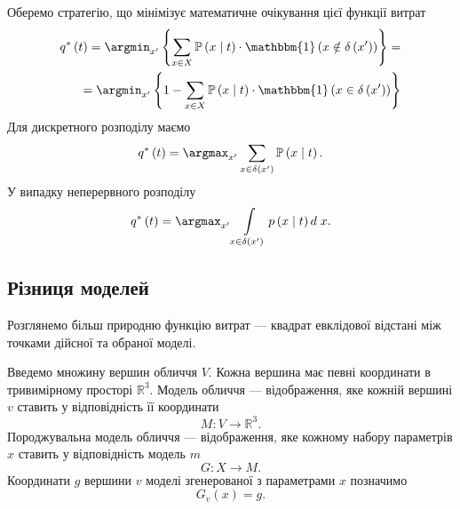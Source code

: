 Оберемо стратегію, що мінімізує математичне очікування цієї функції витрат
\begin{equation*}
  \begin{split}
    q^* \left( t \right)
    = \argmin_{x'} \left\{
      \sum\limits_{x \in X}
        \mathbb{P}\left( x \;\middle|\;  t \right)
        \cdot \mathbbm{1} \left( x \notin \delta\left( x' \right) \right)
      \right\} = \\
    = \argmin_{x'} \left\{
      1 -
      \sum\limits_{x \in X}
        \mathbb{P}\left( x \;\middle|\;  t \right)
        \cdot \mathbbm{1} \left( x \in \delta\left( x' \right) \right)
      \right\}
  \end{split}
\end{equation*}
Для дискретного розподілу маємо
\begin{equation*}
  q^* \left( t \right)
  = \argmax_{x'} \sum\limits_{x \in \delta\left( x' \right)}
    \mathbb{P}\left( x \;\middle|\;  t \right).
\end{equation*}
У випадку неперервного розподілу
\begin{equation*}
  q^* \left( t \right)
  = \argmax_{x'} \int\limits_{x \in \delta\left( x' \right)}
    p\left( x \;\middle|\;  t \right) d\; x.
\end{equation*}

\subsection{Різниця моделей}

Розглянемо більш природню функцію витрат ---
квадрат евклідової відстані між точками дійсної та обраної моделі.

Введемо множину вершин обличчя $V$.
Кожна вершина має певні координати в тривимірному просторі $\mathbb{R}^3$.
Модель обличчя --- відображення,
яке кожній вершині $v$ ставить у відповідність її координати
\begin{equation*}
  M: V \rightarrow \mathbb{R}^3.
\end{equation*}
Породжувальна модель обличчя --- відображення,
яке кожному набору параметрів $x$ ставить у відповідність модель $m$
\begin{equation*}
  G: X \rightarrow M.
\end{equation*}
Координати $g$ вершини $v$ моделі згенерованої з параметрами $x$ позначимо
\begin{equation*}
  G_v\left( x \right) = g.
\end{equation*}

